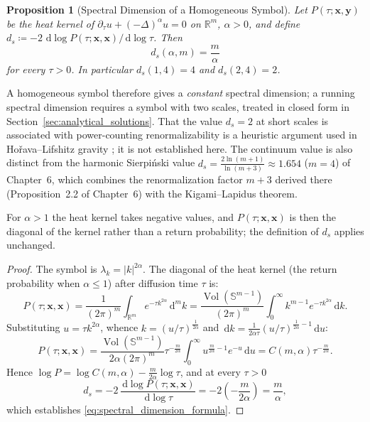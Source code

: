 \documentclass[11pt,a4paper,reqno]{amsart}
\newtheorem{proposition}[theorem]{Proposition}
\theoremstyle{definition}
\numberwithin{equation}{section}
\providecommand{\R}{\mathbb{R}}
\providecommand{\Sph}{\mathbb{S}}
\newcommand{\dif}{\,\mathrm{d}}
\providecommand{\xref}[2]{#2}
\providecommand{\Sph}{\mathbb{S}}
\providecommand{\R}{\mathbb{R}}
\begin{document}
\begin{proposition}[Spectral Dimension of a Homogeneous Symbol]
\label{thm:running_spectral_dimension}
Let $P(\tau; \mathbf{x}, \mathbf{y})$ be the heat kernel of $\partial_\tau u + (-\Delta)^\alpha u = 0$ on $\R^m$, $\alpha > 0$, and define $d_s \coloneqq -2\, \dif \log P(\tau;\mathbf{x},\mathbf{x}) / \dif \log \tau$. Then
\begin{equation}
    \label{eq:spectral_dimension_formula}
    d_s(\alpha, m) = \frac{m}{\alpha}
\end{equation}
for every $\tau > 0$. In particular $d_s(1,4) = 4$ and $d_s(2,4) = 2$.
\end{proposition}

A homogeneous symbol therefore gives a \emph{constant} spectral dimension; a running spectral dimension requires a symbol with two scales, treated in closed form in Section~\ref{sec:analytical_solutions}. That the value $d_s = 2$ at short scales is associated with power-counting renormalizability is a heuristic argument used in Ho\v{r}ava--Lifshitz gravity \cite{horava2009spectral}; it is not established here. The continuum value is also distinct from the harmonic Sierpi\'nski value $d_s = \frac{2\ln(m+1)}{\ln(m+3)} \approx 1.654$ ($m=4$) of Chapter~6, which combines the renormalization factor $m+3$ derived there (Proposition~\xref{chap06:assump:kigami_decimation}{2.2} of Chapter~6) with the Kigami--Lapidus theorem.

For $\alpha > 1$ the heat kernel takes negative values, and $P(\tau; \mathbf{x}, \mathbf{x})$ is then the diagonal of the kernel rather than a return probability; the definition of $d_s$ applies unchanged.

\begin{proof}
The symbol is $\lambda_k = |k|^{2\alpha}$. The diagonal of the heat kernel (the return probability when $\alpha \le 1$) after diffusion time $\tau$ is:
\begin{equation}
    P(\tau; \mathbf{x}, \mathbf{x}) = \frac{1}{(2\pi)^m} \int_{\R^m} e^{-\tau k^{2\alpha}} \dif^m k = \frac{\operatorname{Vol}(\Sph^{m-1})}{(2\pi)^m} \int_0^\infty k^{m-1} e^{-\tau k^{2\alpha}} \dif k.
\end{equation}
Substituting $u = \tau k^{2\alpha}$, whence $k = (u/\tau)^{\frac{1}{2\alpha}}$ and $\dif k = \frac{1}{2\alpha \tau} (u/\tau)^{\frac{1}{2\alpha} - 1} \dif u$:
\begin{equation}
    P(\tau; \mathbf{x}, \mathbf{x}) = \frac{\operatorname{Vol}(\Sph^{m-1})}{2\alpha (2\pi)^m} \tau^{-\frac{m}{2\alpha}} \int_0^\infty u^{\frac{m}{2\alpha} - 1} e^{-u} \dif u = C(m, \alpha) \tau^{-\frac{m}{2\alpha}}.
\end{equation}
Hence $\log P = \log C(m,\alpha) - \frac{m}{2\alpha}\log\tau$, and at every $\tau > 0$
\begin{equation}
    d_s = -2\, \frac{\dif \log P(\tau; \mathbf{x}, \mathbf{x})}{\dif \log \tau} = -2 \left( -\frac{m}{2\alpha} \right) = \frac{m}{\alpha},
\end{equation}
which establishes \eqref{eq:spectral_dimension_formula}.
\end{proof}
\end{document}
